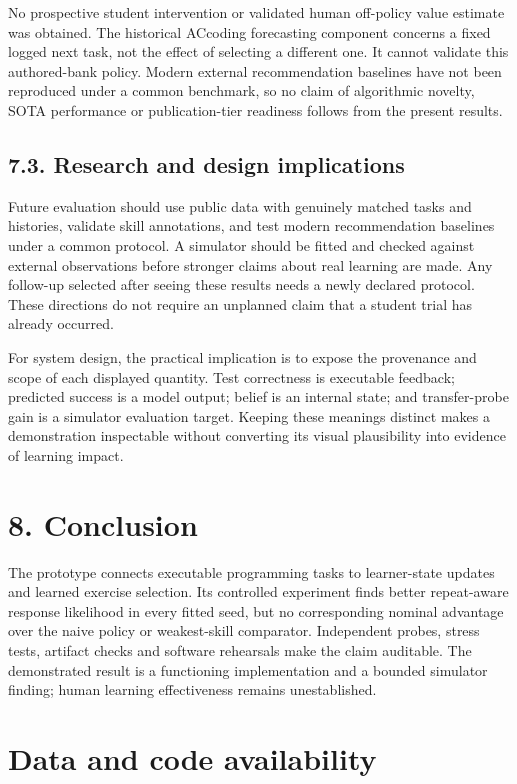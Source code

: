 \documentclass[preprint,11pt,authoryear]{elsarticle}
\begin{document}
No prospective student intervention or validated human off-policy value estimate was obtained. The historical ACcoding forecasting component concerns a fixed logged next task, not the effect of selecting a different one. It cannot validate this authored-bank policy. Modern external recommendation baselines have not been reproduced under a common benchmark, so no claim of algorithmic novelty, SOTA performance or publication-tier readiness follows from the present results.

\subsection*{7.3. Research and design implications}

Future evaluation should use public data with genuinely matched tasks and histories, validate skill annotations, and test modern recommendation baselines under a common protocol. A simulator should be fitted and checked against external observations before stronger claims about real learning are made. Any follow-up selected after seeing these results needs a newly declared protocol. These directions do not require an unplanned claim that a student trial has already occurred.

For system design, the practical implication is to expose the provenance and scope of each displayed quantity. Test correctness is executable feedback; predicted success is a model output; belief is an internal state; and transfer-probe gain is a simulator evaluation target. Keeping these meanings distinct makes a demonstration inspectable without converting its visual plausibility into evidence of learning impact.

\section*{8. Conclusion}

The prototype connects executable programming tasks to learner-state updates and learned exercise selection. Its controlled experiment finds better repeat-aware response likelihood in every fitted seed, but no corresponding nominal advantage over the naive policy or weakest-skill comparator. Independent probes, stress tests, artifact checks and software rehearsals make the claim auditable. The demonstrated result is a functioning implementation and a bounded simulator finding; human learning effectiveness remains unestablished.

\section*{Data and code availability}
\end{document}
